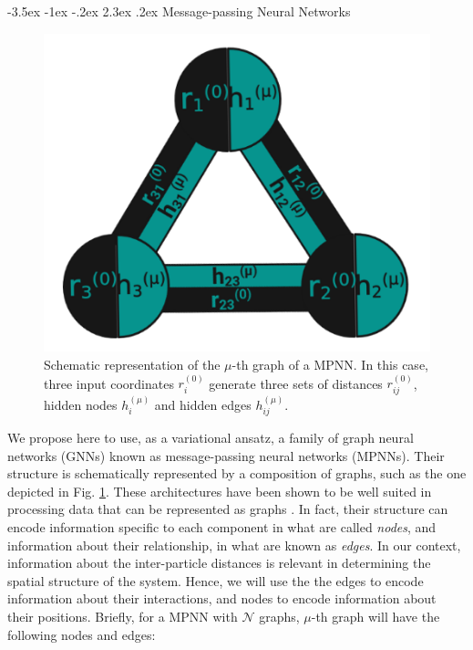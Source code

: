 \documentclass[a4paper, 12pt, oneside]{article}
\makeatletter
\renewcommand{\subsection}{\@startsection{subsection}{1}{\z@}%
             {-3.5ex \@plus-1ex \@minus-.2ex}%
             {2.3ex \@plus.2ex}%
             {\normalfont\normalsize\bfseries}}
\makeatother
\begin{document}
\subsection{Message-passing Neural Networks}\label{sec:methods_MPNN}
\begin{figure}
    \centering
    \includegraphics[scale=0.35]{figures/GNN_diagram.png}
    \captionsetup{width=0.35\textwidth} 
    \caption{\label{fig:GNN_diagram} Schematic representation of the $\mu$-th graph of a MPNN. In this case,
     three input coordinates $r_i^{(0)}$ generate three sets of distances $r_{ij}^{(0)}$, hidden nodes $h_{i}^{(\mu)}$ and hidden edges $h_{ij}^{(\mu)}$.}
\end{figure}

We propose here to use, as a variational ansatz, a family of graph neural networks (GNNs) known as 
message-passing neural networks (MPNNs). Their structure is schematically represented by a composition of graphs, such 
as the one depicted in Fig. \ref{fig:GNN_diagram}. These architectures have been shown 
to be well suited in processing data that can be represented as graphs \cite{scarselli_2009, micheli_2009}. In fact, their structure can encode information specific to each 
component in what are called \textit{nodes}, and information about their relationship, in what are 
known as \textit{edges}. In our context, information about the inter-particle distances is relevant in determining 
the spatial structure of the system. Hence, we will use the the edges to encode information 
about their interactions, and nodes to encode information about their positions. Briefly, for 
a MPNN with $\mathcal{N}$ graphs, $\mu$-th graph will have the following nodes and edges:
\end{document}
